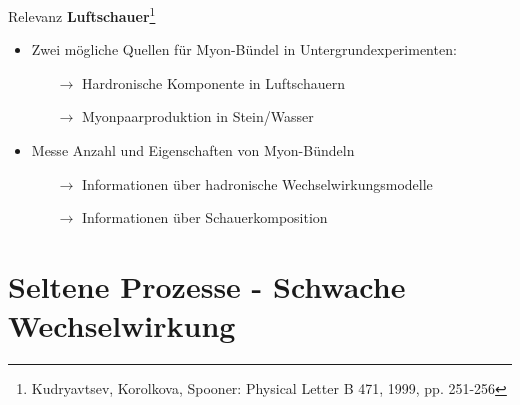 \documentclass[aspectratio=1610, captions=tableheading, 11pt]{beamer}
\begin{document}
\begin{frame}{Relevanz}
	 \textbf{Luftschauer}\footnote{Kudryavtsev, Korolkova, Spooner: Physical Letter B 471, 1999, pp. 251-256}
	 \begin{itemize}
	 	\item Zwei mögliche Quellen für Myon-Bündel in Untergrundexperimenten:
	 	\begin{itemize}
	 		\item[$\rightarrow$] Hardronische Komponente in Luftschauern
	 		\item[$\rightarrow$] Myonpaarproduktion in Stein/Wasser
	 	\end{itemize}
	 	\vspace{5mm}
	 	\item Messe Anzahl und Eigenschaften von Myon-Bündeln
	 	\begin{itemize}
	 		\item[$\rightarrow$] Informationen über hadronische Wechselwirkungsmodelle
	 		\item[$\rightarrow$] Informationen über Schauerkomposition
	 	\end{itemize}
	 \end{itemize}
\end{frame}


\section{Seltene Prozesse - Schwache Wechselwirkung}
\end{document}
